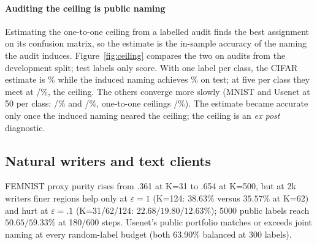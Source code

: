 

\paragraph{Auditing the ceiling is public naming}
Estimating the one-to-one ceiling from a labelled audit finds the best
assignment on its confusion matrix, so the estimate is the in-sample accuracy
of the naming the audit induces. Figure~\ref{fig:ceiling} compares the two
on audits from the development split; test labels only score.
With one label per class, the CIFAR estimate is \AuditCifarOneEst{}\% while
the induced naming achieves \AuditCifarOneHeld{}\% on test; at five per
class they meet at \AuditCifarFiveEst{}/\AuditCifarFiveHeld{}\%, the
ceiling. The others converge more slowly (MNIST and Usenet at 50 per class:
\AuditMnistFiftyEst{}/\AuditMnistFiftyHeld{}\% and
\AuditUsenetFiftyEst{}/\AuditUsenetFiftyHeld{}\%, one-to-one ceilings
\CeilMnist{}/\CeilUsenet{}\%). The estimate became accurate only once the
induced naming neared the ceiling; the ceiling is an \emph{ex post} diagnostic.

\subsection{Natural writers and text clients}
\label{sec:eval:natural}

FEMNIST proxy purity rises from .361 at K=31 to .654 at K=500, but at 2k
writers finer regions help only at $\varepsilon=1$ (K=124: $38.63\%$ versus
$35.57\%$ at K=62) and hurt at $\varepsilon=.1$ (K=31/62/124:
$22.68/19.80/12.63\%$); 5000 public labels reach $50.65/59.33\%$ at
180/600 steps. Usenet's public portfolio matches
or exceeds joint naming at every random-label budget (both $63.90\%$
balanced at 300 labels).
